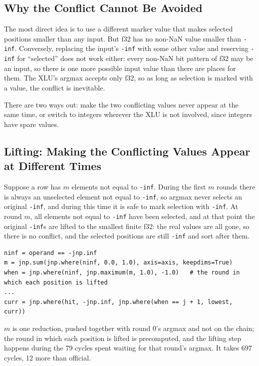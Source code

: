 \documentclass[sigconf,nonacm,balance=false]{acmart}
\newcommand{\code}[1]{\texttt{#1}}
\begin{document}
\subsection{Why the Conflict Cannot Be Avoided}
\label{sec:4.6}

The most direct idea is to use a different marker value that makes selected positions smaller than any input. But f32 has no non-NaN value smaller than \code{-inf}. Conversely, replacing the input's \code{-inf} with some other value and reserving \code{-inf} for ``selected'' does not work either: every non-NaN bit pattern of f32 may be an input, so there is one more possible input value than there are places for them. The XLU's argmax accepts only f32, so as long as selection is marked with a value, the conflict is inevitable.

There are two ways out: make the two conflicting values never appear at the same time, or switch to integers wherever the XLU is not involved, since integers have spare values.

\subsection{Lifting: Making the Conflicting Values Appear at Different Times}
\label{sec:4.7}

Suppose a row has $m$ elements not equal to \code{-inf}. During the first $m$ rounds there is always an unselected element not equal to \code{-inf}, so argmax never selects an original \code{-inf}, and during this time it is safe to mark selection with \code{-inf}. At round $m$, all elements not equal to \code{-inf} have been selected, and at that point the original \code{-inf}s are lifted to the smallest finite f32: the real values are all gone, so there is no conflict, and the selected positions are still \code{-inf} and sort after them.

\begin{lstlisting}
ninf = operand == -jnp.inf
m = jnp.sum(jnp.where(ninf, 0.0, 1.0), axis=axis, keepdims=True)
when = jnp.where(ninf, jnp.maximum(m, 1.0), -1.0)   # the round in which each position is lifted
...
curr = jnp.where(hit, -jnp.inf, jnp.where(when == j + 1, lowest, curr))
\end{lstlisting}
$m$ is one reduction, pushed together with round 0's argmax and not on the chain; the round in which each position is lifted is precomputed, and the lifting step happens during the 79 cycles spent waiting for that round's argmax. It takes 697 cycles, 12 more than official.
\end{document}
